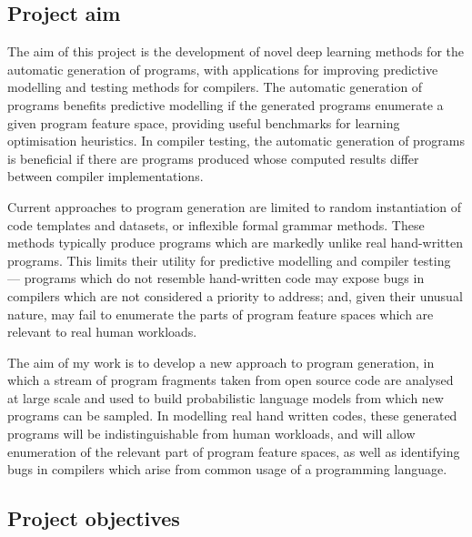 \subsection{Project aim}

The aim of this project is the development of novel deep learning methods for the automatic generation of programs, with applications for improving predictive modelling and testing methods for compilers. The automatic generation of programs benefits predictive modelling if the generated programs enumerate a given program feature space, providing useful benchmarks for learning optimisation heuristics. In compiler testing, the automatic generation of programs is beneficial if there are programs produced whose computed results differ between compiler implementations.

Current approaches to program generation are limited to random instantiation of code templates and datasets, or inflexible formal grammar methods. These methods typically produce programs which are markedly unlike real hand-written programs. This limits their utility for predictive modelling and compiler testing --- programs which do not resemble hand-written code may expose bugs in compilers which are not considered a priority to address; and, given their unusual nature, may fail to enumerate the parts of program feature spaces which are relevant to real human workloads.

The aim of my work is to develop a new approach to program generation, in which a stream of program fragments taken from open source code are analysed at large scale and used to build probabilistic language models from which new programs can be sampled. In modelling real hand written codes, these generated programs will be indistinguishable from human workloads, and will allow enumeration of the relevant part of program feature spaces, as well as identifying bugs in compilers which arise from common usage of a programming language.


\subsection{Project objectives}\label{sec:objectives}

